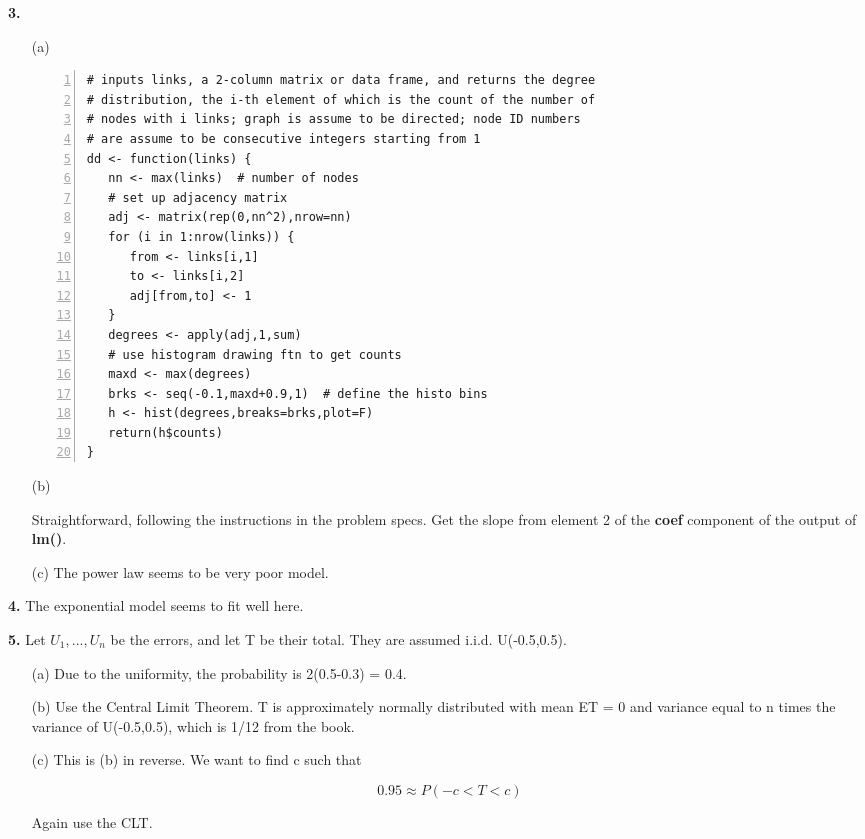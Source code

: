 \documentclass{article}
\begin{document}
{\bf 3.}

\begin{itemize}

\item [(a)]

\begin{Verbatim}[fontsize=\relsize{-2},numbers=left]
# inputs links, a 2-column matrix or data frame, and returns the degree
# distribution, the i-th element of which is the count of the number of
# nodes with i links; graph is assume to be directed; node ID numbers
# are assume to be consecutive integers starting from 1
dd <- function(links) {
   nn <- max(links)  # number of nodes
   # set up adjacency matrix
   adj <- matrix(rep(0,nn^2),nrow=nn)
   for (i in 1:nrow(links)) {
      from <- links[i,1]
      to <- links[i,2]
      adj[from,to] <- 1
   }
   degrees <- apply(adj,1,sum)
   # use histogram drawing ftn to get counts
   maxd <- max(degrees)
   brks <- seq(-0.1,maxd+0.9,1)  # define the histo bins
   h <- hist(degrees,breaks=brks,plot=F)
   return(h$counts)
}
\end{Verbatim}

\item [(b)]

Straightforward, following the instructions in the problem specs.  Get
the slope from element 2 of the {\bf coef} component of the output of
{\bf lm()}.

\item [(c)] The power law seems to be very poor model.

\end{itemize}

{\bf 4.}  The exponential model seems to fit well here.

{\bf 5.}  Let $U_1,...,U_n$ be the errors, and let T be their total.
They are assumed i.i.d.  U(-0.5,0.5).

\begin{itemize}

\item [(a)] Due to the uniformity, the probability is 2(0.5-0.3) = 0.4.

\item [(b)] Use the Central Limit Theorem.  T is approximately normally
distributed with mean ET = 0 and variance equal to n times the variance
of U(-0.5,0.5), which is 1/12 from the book.

\item [(c)] This is (b) in reverse.  We want to find c such that

\begin{equation}
0.95 \approx P(-c < T < c)
\end{equation}

Again use the CLT.

\end{itemize}
\end{document}
